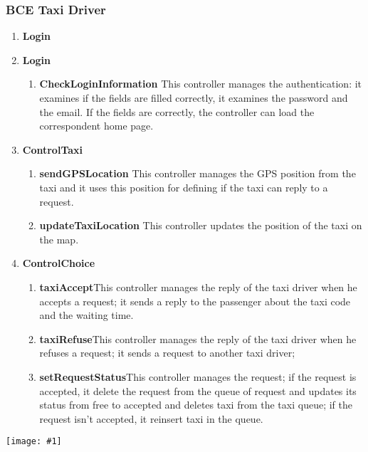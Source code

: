 \documentclass[11pt, a4paper,titlepage]{article}
\newcommand{\image}[1]{
	\begin{center}
		\noindent \texttt{[image: \#1]}
	\end{center}
	}
\begin{document}
\subsubsection{BCE Taxi Driver}
\begin{enumerate}
	\item \textbf{Login}
		\item \textbf{Login}
		\begin{enumerate}
			\item \textbf{CheckLoginInformation} This controller manages the authentication: it  
			examines if the fields are filled correctly, it examines the password and the email. 
			If the fields are correctly, the controller can load the correspondent home page.
		\end{enumerate}
	\item \textbf{ControlTaxi}
	\begin{enumerate}
		\item \textbf{sendGPSLocation} This controller manages the GPS position from the taxi and it 
		uses this position for defining if the taxi can reply to a request.
		\item \textbf{updateTaxiLocation} This controller updates the position of the taxi on the map.
	\end{enumerate}	
	\item \textbf{ControlChoice}
	\begin{enumerate}
		\item \textbf{taxiAccept}This controller manages the reply of the taxi driver when he accepts a request; it sends a reply to the passenger about the taxi code and the waiting time.
		\item \textbf{taxiRefuse}This controller manages the reply of the taxi driver when he refuses a request; it sends a request to another taxi driver;
		\item \textbf{setRequestStatus}This controller manages the request; if the request is accepted, 
		it delete the request from the queue of request and updates its status from free to 
		accepted and deletes taxi from the taxi queue; if the request isn’t accepted, it reinsert taxi in the queue.
	\end{enumerate}
\end{enumerate}
\image{BCETaxiDriver.png}
\newpage
\end{document}
